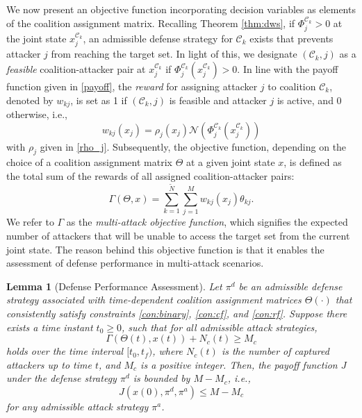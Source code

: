 \documentclass[journal]{IEEEtran}
\newtheorem{Lemma}{\bf Lemma}
\newcommand{\n}{\mathscr{N}}
\newcommand{\C}{\mathcal{C}}
\newcommand{\1}{\mathbf{1}}
\begin{document}
We now present an objective function incorporating decision variables as elements of the coalition assignment matrix. Recalling Theorem \ref{thm:dws}, if $\Phi^{\C_k}_j>0$ at the joint state $x^{\C_k}_j$, an admissible defense strategy for $\C_k$ exists that prevents attacker $j$ from reaching the target set. In light of this, we designate $(\C_k,j)$ as a \textit{feasible} coalition-attacker pair at $x^{\C_k}_j$ if $\Phi^{\C_k}_j(x^{\C_k}_j)>0$. In line with the payoff function given in \eqref{payoff}, the \textit{reward} for assigning attacker $j$ to coalition $\C_k$, denoted by $w_{kj}$, is set as 1 if $(\C_k,j)$ is feasible and attacker $j$ is active, and 0 otherwise, i.e.,
\begin{equation*}
	w_{kj}(x_j)=\rho_j(x_j)\n(\Phi^{\C_k}_j(x^{\C_k}_j))
\end{equation*}
with $\rho_j$ given in \eqref{rho_j}. Subsequently, the objective function, depending on the choice of a coalition assignment matrix $\Theta$ at a given joint state $x$, is defined as the total sum of the rewards of all assigned coalition-attacker pairs:
\begin{equation}\label{fun:maof}
	\Gamma(\Theta,x)=\sum_{k=1}^{\tilde{N}}\sum_{j=1}^{M}w_{kj}(x_j)\theta_{kj}.
\end{equation}
We refer to $\Gamma$ as the \textit{multi-attack objective function}, which signifies the expected number of attackers that will be unable to access the target set from the current joint state. The reason behind this objective function is that it enables the assessment of defense performance in multi-attack scenarios.

\begin{Lemma}[Defense Performance Assessment]\label{lem:oe}
Let $\pi^d$ be an admissible defense strategy associated with time-dependent coalition assignment matrices $\Theta(\cdot)$ that consistently satisfy constraints \eqref{con:binary}, \eqref{con:cf}, and \eqref{con:rf}. Suppose there exists a time instant $t_0\geq0$, such that for all admissible attack strategies, 
\begin{equation}\label{ineq:gamma}
	\Gamma(\Theta(t),x(t))+N_c(t)\geq M_c
\end{equation}
holds over the time interval $[t_0,t_f)$, where $N_c(t)$ is the number of captured attackers up to time $t$, and $M_c$ is a positive integer. Then, the payoff function $J$ under the defense strategy $\pi^d$ is bounded by $M-M_c$, i.e., 
\begin{equation*}
	J(x(0),\pi^d,\pi^a)\leq M-M_c
\end{equation*}
for any admissible attack strategy $\pi^a$.
\end{Lemma}
\end{document}
